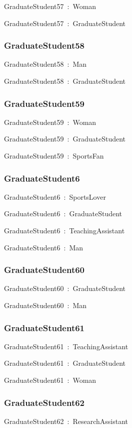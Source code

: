 \documentclass{article}
\begin{document}
GraduateStudent57~:~Woman

GraduateStudent57~:~GraduateStudent

\subsubsection*{GraduateStudent58}

GraduateStudent58~:~Man

GraduateStudent58~:~GraduateStudent

\subsubsection*{GraduateStudent59}

GraduateStudent59~:~Woman

GraduateStudent59~:~GraduateStudent

GraduateStudent59~:~SportsFan

\subsubsection*{GraduateStudent6}

GraduateStudent6~:~SportsLover

GraduateStudent6~:~GraduateStudent

GraduateStudent6~:~TeachingAssistant

GraduateStudent6~:~Man

\subsubsection*{GraduateStudent60}

GraduateStudent60~:~GraduateStudent

GraduateStudent60~:~Man

\subsubsection*{GraduateStudent61}

GraduateStudent61~:~TeachingAssistant

GraduateStudent61~:~GraduateStudent

GraduateStudent61~:~Woman

\subsubsection*{GraduateStudent62}

GraduateStudent62~:~ResearchAssistant
\end{document}

